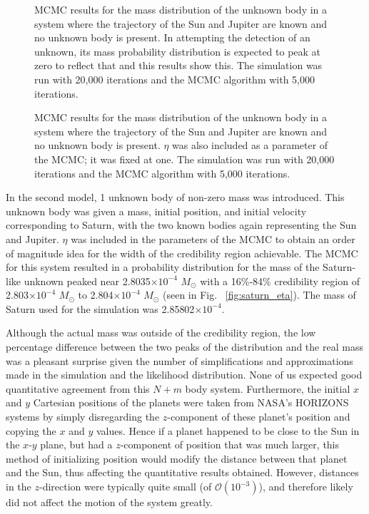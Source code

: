 \documentclass[twocolumn]{aastex63}
\newcommand{\msun}{M_\odot}
\begin{document}
\begin{figure}[ht!]
\caption{MCMC results for the mass distribution of the unknown body in a system where the trajectory of the Sun and Jupiter are known and no unknown body is present. In attempting the detection of an unknown, its mass probability distribution is expected to peak at zero to reflect that and this results show this. The simulation was run with 20,000 iterations and the MCMC algorithm with 5,000 iterations.\label{fig:zero_mass_unknown}}
\end{figure}

\begin{figure}[ht!]
\caption{MCMC results for the mass distribution of the unknown body in a system where the trajectory of the Sun and Jupiter are known and no unknown body is present. $\eta$ was also included as a parameter of the MCMC; it was fixed at one. The simulation was run with 20,000 iterations and the MCMC algorithm with 5,000 iterations. \label{fig:zero_mass_unknown_eta}}
\end{figure}

In the second model, 1 unknown body of non-zero mass was introduced. This unknown body was given a mass, initial position, and initial velocity corresponding to Saturn, with the two known bodies again representing the Sun and Jupiter. $\eta$ was included in the parameters of the MCMC to obtain an order of magnitude idea for the width of the credibility region achievable. The MCMC for this system resulted in a probability distribution for the mass of the Saturn-like unknown peaked near 2.8035$\times 10 ^ {-4}$ $\msun$ with a 16\%-84\% credibility region of 2.803$\times 10 ^ {-4}$ $\msun$ to 2.804$\times 10 ^ {-4}$ $\msun$ (seen in Fig.~ \ref{fig:saturn_eta}). The mass of Saturn used for the simulation was 2.85802$\times 10 ^ {-4}$. 

Although the actual mass was outside of the credibility region, the low percentage difference between the two peaks of the distribution and the real mass was a pleasant surprise given the number of simplifications and approximations made in the simulation and the likelihood distribution. None of us expected good quantitative agreement from this $N + m$ body system. Furthermore, the initial $x$ and $y$ Cartesian positions of the planets were taken from NASA's HORIZONS systems by simply disregarding the $z$-component of these planet's position and copying the $x$ and $y$ values. Hence if a planet happened to be close to the Sun in the $x$-$y$ plane, but had a $z$-component of position that was much larger, this method of initializing position would  modify the distance between that planet and the Sun, thus affecting the quantitative results obtained. However, distances in the $z$-direction were typically quite small (of $\mathcal{O}(10^{-3})$), and therefore likely did not affect the motion of the system greatly.
\end{document}
